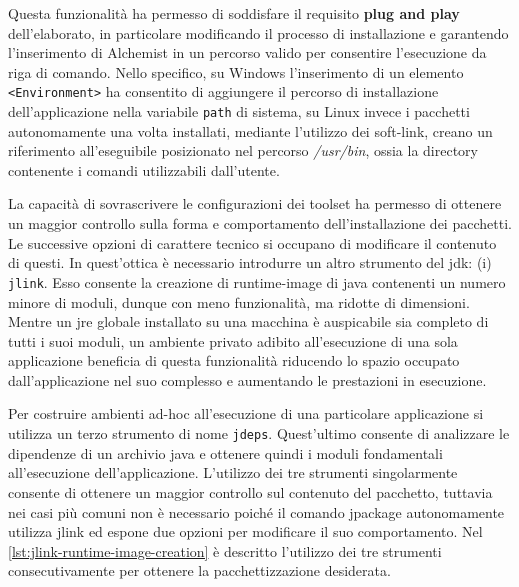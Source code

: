 Questa funzionalità ha permesso di soddisfare il requisito \textbf{plug and play} dell'elaborato, in particolare modificando il processo di installazione e garantendo l'inserimento di Alchemist in un percorso valido per consentire l'esecuzione da riga di comando. Nello specifico, su Windows l'inserimento di un elemento \texttt{<Environment>} ha consentito di aggiungere il percorso di installazione dell'applicazione nella variabile \texttt{path} di sistema, su Linux invece i pacchetti autonomamente una volta installati, mediante l'utilizzo dei soft-link, creano un riferimento all'eseguibile posizionato nel percorso \textit{/usr/bin}, ossia la directory contenente i comandi utilizzabili dall'utente.

La capacità di sovrascrivere le configurazioni dei toolset ha permesso di ottenere un maggior controllo sulla forma e comportamento dell'installazione dei pacchetti. Le successive opzioni di carattere tecnico si occupano di modificare il contenuto di questi. In quest'ottica è necessario introdurre un altro strumento del \ac{jdk}: (i) \texttt{jlink}. Esso consente la creazione di runtime-image di java contenenti un numero minore di moduli, dunque con meno funzionalità, ma ridotte di dimensioni. Mentre un \ac{jre} globale installato su una macchina è auspicabile sia completo di tutti i suoi moduli, un ambiente privato adibito all'esecuzione di una sola applicazione beneficia di questa funzionalità riducendo lo spazio occupato dall'applicazione nel suo complesso e aumentando le prestazioni in esecuzione. 

Per costruire ambienti ad-hoc all'esecuzione di una particolare applicazione si utilizza un terzo strumento di nome \texttt{jdeps}. Quest'ultimo consente di analizzare le dipendenze di un archivio java e ottenere quindi i moduli fondamentali all'esecuzione dell'applicazione. L'utilizzo dei tre strumenti singolarmente consente di ottenere un maggior controllo sul contenuto del pacchetto, tuttavia nei casi più comuni non è necessario poiché il comando jpackage autonomamente utilizza jlink ed espone due opzioni per modificare il suo comportamento. Nel \cref{lst:jlink-runtime-image-creation} è descritto l'utilizzo dei tre strumenti consecutivamente per ottenere la pacchettizzazione desiderata.



